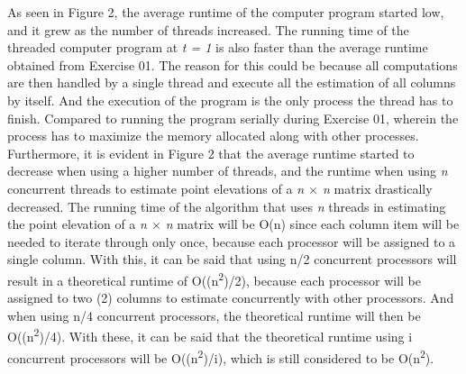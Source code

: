 \documentclass{article}
\begin{document}
\indent As seen in Figure 2, the average runtime of the computer program started low, and it grew as the number of threads increased. The running time of the threaded computer program at \emph{t = 1} is also faster than the average runtime obtained from Exercise 01. The reason for this could be because all computations are then handled by a single thread and execute all the estimation of all columns by itself. And the execution of the program is the only process the thread has to finish. Compared to running the program serially during Exercise 01, wherein the process has to maximize the memory allocated along with other processes. \\
\indent Furthermore, it is evident in Figure 2 that the average runtime started to decrease when using a higher number of threads, and the runtime when using \emph{n} concurrent threads to estimate point elevations of a \emph{n $\times$ n} matrix drastically decreased. The running time of the algorithm that uses \emph{n} threads in estimating the point elevation of a \emph{n $\times$ n} matrix will be O(n) since each column item will be needed to iterate through only once, because each processor will be assigned to a single column. With this, it can be said that using n/2 concurrent processors will result in a theoretical runtime of O((n\textsuperscript{2})/2), because each processor will be assigned to two (2) columns to estimate concurrently with other processors. And when using n/4 concurrent processors, the theoretical runtime will then be O((n\textsuperscript{2})/4). With these, it can be said that the theoretical runtime using i concurrent processors will be O((n\textsuperscript{2})/i), which is still considered to be O(n\textsuperscript{2}).
\end{document}
